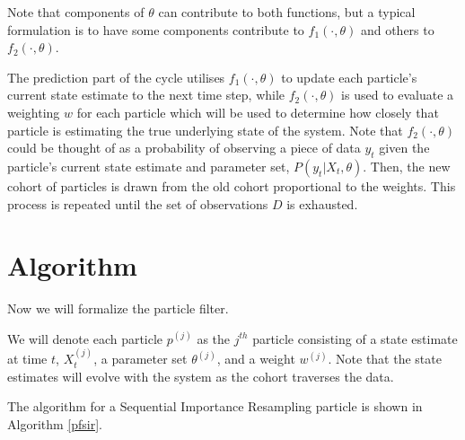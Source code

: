 \documentclass[12pt]{article}
\begin{document}
	Note that components of $\theta$ can contribute to both functions, but a typical formulation is to have some components contribute to $f_1 (\cdot, \theta)$ and others to $f_2 (\cdot,\theta)$.

	The prediction part of the cycle utilises $f_1 (\cdot, \theta)$ to update each particle's current state estimate to the next time step, while $f_2 (\cdot, \theta)$ is used to evaluate a weighting $w$ for each particle which will be used to determine how closely that particle is estimating the true underlying state of the system. Note that $f_2 (\cdot, \theta)$ could be thought of as a probability of observing a piece of data $y_t$ given the particle's current state estimate and parameter set, $P(y_t | X_t, \theta)$. Then, the new cohort of particles is drawn from the old cohort proportional to the weights. This process is repeated until the set of observations $D$ is exhausted.


\section{Algorithm}

    Now we will formalize the particle filter.

    We will denote each particle $p^{(j)}$ as the $j^{th}$ particle consisting of a state estimate at time $t$, $X_t^{(j)}$, a parameter set $\theta^{(j)}$, and a weight $w^{(j)}$. Note that the state estimates will evolve with the system as the cohort traverses the data.

    The algorithm for a Sequential Importance Resampling particle is shown in Algorithm \ref{pfsir}.\\
    
\end{document}

